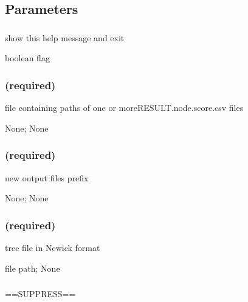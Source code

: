 \documentclass[letterpaper,12pt,english]{sphinxmanual}
\begin{document}


\subsection{Parameters}
\label{\detokenize{prog_desc:id2}}

\subsubsection{}
\label{\detokenize{prog_desc:id3}}
 show this help message and exit

 boolean flag


\subsubsection{ (required)}
\label{\detokenize{prog_desc:d-nodedata-required}}
 file containing paths of one or moreRESULT.node.score.csv files

 None;  None


\subsubsection{ (required)}
\label{\detokenize{prog_desc:o-out-required}}
 new output files prefix

 None;  None


\subsubsection{ (required)}
\label{\detokenize{prog_desc:id4}}
 tree file in Newick format

 file path;  None


\subsubsection{}
\label{\detokenize{prog_desc:id5}}
 ==SUPPRESS==
\end{document}
